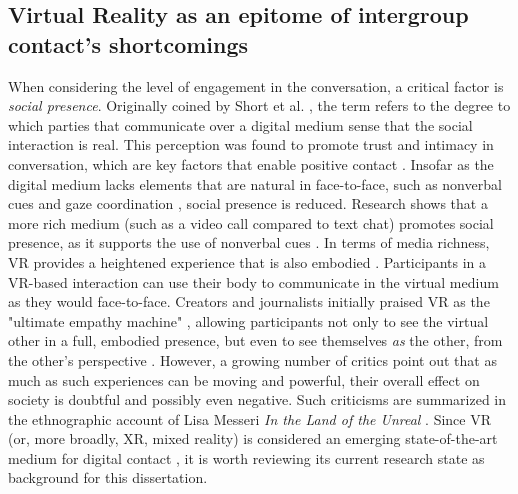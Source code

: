 \documentclass[dissertation,math,vertlayout,pdfa,colorlinks]{aaltoseries}
\begin{document}
\subsection{Virtual Reality as an epitome of intergroup contact's shortcomings}
\label{sec:vr_empathy}
When considering the level of engagement in the conversation, a critical factor is \textit{social presence}. Originally coined by Short et al. \cite{shortSocialPsychologyTelecommunications1976}, the term refers to the degree to which parties that communicate over a digital medium sense that the social interaction is real. This perception was found to promote trust and intimacy in conversation, which are key factors that enable positive contact \cite{schumannWhenComputermediatedIntergroup2017}. Insofar as the digital medium lacks elements that are natural in face-to-face, such as nonverbal cues and gaze coordination \cite{kendonConductingInteractionPatterns1990}, social presence is reduced. Research shows that a more rich medium (such as a video call compared to text chat) promotes social presence, as it supports the use of nonverbal cues \cite{newberryMediaRichnessSocial2001}. In terms of media richness, VR provides a heightened experience that is also embodied \cite{slaterInfluenceBodyMovement1998}. Participants in a VR-based interaction can use their body to communicate in the virtual medium as they would face-to-face. Creators and journalists initially praised VR as the "ultimate empathy machine" \cite{milkHowVirtualReality2015}, allowing participants not only to see the virtual other in a full, embodied presence, but even to see themselves \textit{as} the other, from the other's perspective \cite{seinfeldEditorialVirtualReality2022}. However, a growing number of critics point out that as much as such experiences can be moving and powerful, their overall effect on society is doubtful and possibly even negative. Such criticisms are summarized in the ethnographic account of Lisa Messeri \textit{In the Land of the Unreal} \cite{messeriLandUnrealVirtual2024}. Since VR (or, more broadly, XR, mixed reality) is considered an emerging state-of-the-art medium for digital contact \cite{chenFuturePrejudiceReduction2024}, it is worth reviewing its current research state as background for this dissertation.
\end{document}
